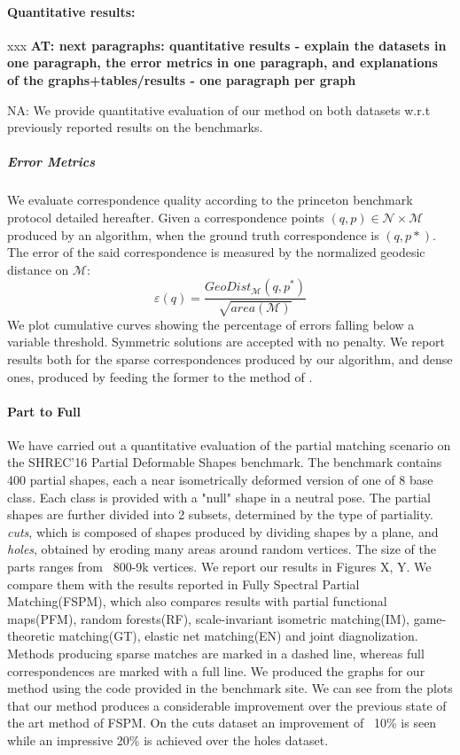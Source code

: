 \documentclass[10pt,twocolumn,letterpaper]{article}
\newcommand{\colornote}[3]{{\color{#1}\bf{#2: #3}\normalfont}}
\newcommand{\colornote}[3]{}
\newcommand {\ayellet}[1]{\colornote{blue}{AT}{#1}}
\newcommand {\nadav}[1]{\colornote{red}{NA}{#1}}
\begin{document}
\paragraph{Quantitative results:} xxx
\ayellet{next paragraphs: quantitative results - explain the datasets in one paragraph, the error metrics in one paragraph, and explanations of the graphs+tables/results - one paragraph per graph}
\nadav{We provide quantitative evaluation of our method on both datasets w.r.t previously reported results on the benchmarks.
\subparagraph{Error Metrics}
We evaluate correspondence quality according to the princeton benchmark protocol\cite{kim2011blended} detailed hereafter. 
Given a correspondence points $(q,p)\in \mathcal{N}\times \mathcal{M}$ produced by an algorithm, when the ground truth correspondence is $(q,p*)$. The error of the said correspondence is measured by the normalized geodesic distance on $\mathcal{M}$:
\begin{equation}
\varepsilon(q)=\frac{GeoDist_{\mathcal{M}}(q,p^*)}{\sqrt{area(\mathcal{M})}}
\end{equation}
We plot cumulative curves showing the percentage of errors falling below a variable threshold. 
Symmetric solutions are accepted with no penalty.
We report results both for the sparse correspondences produced by our algorithm, and dense ones, produced by feeding the former to the method of \cite{litany2017fully}.
\paragraph{Part to Full}
We have carried out a quantitative evaluation of the partial matching scenario on the SHREC'16 Partial Deformable Shapes benchmark. The benchmark contains 400 partial shapes, each a near isometrically deformed version of one of 8 base class.
Each class is provided with a "null" shape in a neutral pose. The partial shapes are further divided into 2 subsets, determined by the type of partiality. 
\textit{cuts}, which is composed of shapes produced by dividing shapes by a plane, and \textit{holes}, obtained by eroding many areas around random vertices. The size of the parts ranges from ~800-9k vertices.
We report our results in Figures X, Y. We compare them with the results reported in Fully Spectral Partial Matching(FSPM)\cite{litany2017fully}, which also compares results with partial functional maps(PFM)\cite{rodola2017partial}, random forests(RF), scale-invariant isometric matching(IM), game-theoretic matching(GT), elastic net matching(EN) and joint diagnolization. 
Methods producing sparse matches are marked in a dashed line, whereas full correspondences are marked with a full line. 
We produced the graphs for our method using the code provided in the benchmark site.
We can see from the plots that our method produces a considerable improvement over the previous state of the art method of FSPM. 
On the cuts dataset an improvement of ~10\% is seen while an impressive 20\% is achieved over the holes dataset.

}
\end{document}
